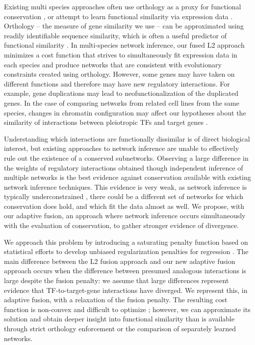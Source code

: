 \documentclass[11pt]{article}
\begin{document}
Existing multi species approaches often use orthology as a proxy for functional conservation \cite{penfold_inferring_2015, joshi_multi-species_2015, kashima_simultaneous_2009, zhang2010nearly}, or attempt to learn functional similarity via expression data \cite{gholami_cross-species_2010}. Orthology -- the measure of gene similarity we use -- can be approximated using readily identifiable sequence similarity, which is often a useful predictor of functional similarity \cite{wilson_assessing_2000}. In multi-species network inference, our fused L2 approach minimizes a cost function that strives to simultaneously fit expression data in each species and produce networks that are consistent with evolutionary constraints created using orthology. However, some genes may have taken on different functions and therefore may have new regulatory interactions. For example, gene duplications may lead to neofunctionalization \cite{eisen_phylogenomics:_1998} of the duplicated genes. In the case of comparing networks from related cell lines from the same species, changes in chromatin configuration may affect our hypotheses about the similarity of interactions between pleiotropic TFs and target genes \cite{li_role_2007}.


Understanding which interactions are functionally dissimilar is of direct biological interest, but existing approaches to network inference are unable to effectively rule out the existence of a conserved subnetworks. Observing a large difference in the weights of regulatory interactions obtained though independent inference of multiple networks is the best evidence against conservation available with existing network inference techniques. This evidence is very weak, as network inference is typically underconstrained \cite{marbach_revealing_2010-1}, there could be a different set of networks for which conservation does hold, and which fit the data almost as well. We propose, with our adaptive fusion, an approach where network inference occurs simultaneously with the evaluation of conservation, to gather stronger evidence of divergence. 

We approach this problem by introducing a saturating penalty function based on statistical efforts to develop unbiased regularization penalties for regression \cite{zhang2010nearly, fan2001variable}. The main difference between the L2 fusion approach and our new adaptive fusion approach occurs when the difference between presumed analogous interactions is large despite the fusion penalty: we assume that large differences represent evidence that TF-to-target-gene interactions have diverged. We represent this, in adaptive fusion, with a relaxation of the fusion penalty. The resulting cost function is non-convex and difficult to optimize \cite{fan2001variable}; however, we can approximate its solution and obtain deeper insight into functional similarity than is available through strict orthology enforcement or the comparison of separately learned networks. 
\end{document}
